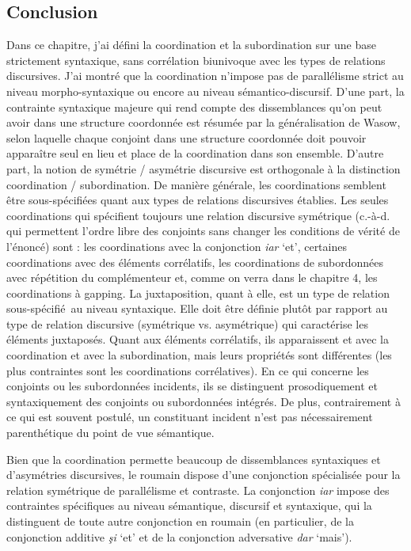 \subsection{Conclusion}
Dans ce chapitre, j'ai défini la coordination et la subordination sur une base strictement syntaxique, sans corrélation biunivoque avec les types de relations discursives. J'ai montré que la coordination n'impose pas de parallélisme strict au niveau morpho-syntaxique ou encore au niveau sémantico-discursif. D'une part, la contrainte syntaxique majeure qui rend compte des dissemblances qu'on peut avoir dans une structure coordonnée est résumée par la généralisation de Wasow, selon laquelle chaque conjoint dans une structure coordonnée doit pouvoir apparaître seul en lieu et place de la coordination dans son ensemble. D'autre part, la notion de symétrie / asymétrie discursive est orthogonale à la distinction coordination / subordination. De manière générale, les coordinations semblent être sous-spécifiées quant aux types de relations discursives établies. Les seules coordinations qui spécifient toujours une relation discursive symétrique (c.-à-d. qui permettent l'ordre libre des conjoints sans changer les conditions de vérité de l'énoncé) sont : les coordinations avec la conjonction \textit{iar} `et', certaines coordinations avec des éléments corrélatifs, les coordinations de subordonnées avec répétition du complémenteur et, comme on verra dans le chapitre 4, les coordinations à gapping. La juxtaposition, quant à elle, est un type de relation sous-spécifié~au niveau syntaxique. Elle doit être définie plutôt par rapport au type de relation discursive (symétrique vs. asymétrique) qui caractérise les éléments juxtaposés. Quant aux éléments corrélatifs, ils apparaissent et avec la coordination et avec la subordination, mais leurs propriétés sont différentes (les plus contraintes sont les coordinations corrélatives). En ce qui concerne les conjoints ou les subordonnées incidents, ils se distinguent prosodiquement et syntaxiquement des conjoints ou subordonnées intégrés. De plus, contrairement à ce qui est souvent postulé, un constituant incident n'est pas nécessairement parenthétique du point de vue sémantique. 

Bien que la coordination permette beaucoup de dissemblances syntaxiques et d'asymétries discursives, le roumain dispose d'une conjonction spécialisée pour la relation symétrique de parallélisme et contraste. La conjonction \textit{iar} impose des contraintes spécifiques au niveau sémantique, discursif et syntaxique, qui la distinguent de toute autre conjonction en roumain (en particulier, de la conjonction additive \textit{şi} `et' et de la conjonction adversative \textit{dar} `mais'). 

